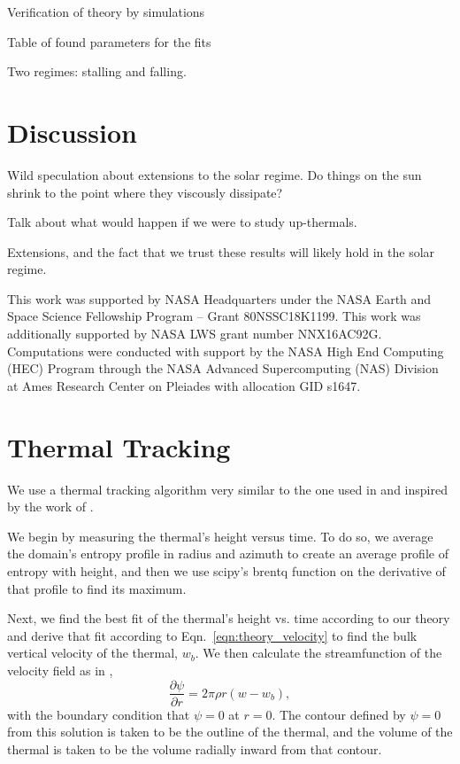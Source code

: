 \documentclass[twocolumn, amsmath, amsfonts, amssymb, trackchanges]{aastex62}
\begin{document}
Verification of theory by simulations

Table of found parameters for the fits

Two regimes: stalling and falling.


\section{Discussion}
\label{sec:discussion}
Wild speculation about extensions to the solar regime. Do things on the sun shrink
to the point where they viscously dissipate?

Talk about what would happen if we were to study up-thermals.

Extensions, and the fact that we trust these results will likely hold in the solar regime.



\begin{acknowledgements}
This work was supported by NASA Headquarters under the NASA Earth and Space
Science Fellowship Program -- Grant 80NSSC18K1199.
This work was additionally supported by  NASA LWS grant number NNX16AC92G.  
Computations were conducted 
with support by the NASA High End Computing (HEC) Program through the NASA 
Advanced Supercomputing (NAS) Division at Ames Research Center on Pleiades
with allocation GID s1647.
\end{acknowledgements}

\appendix
\section{Thermal Tracking}
\label{appendix:tracking}
We use a thermal tracking algorithm very similar to the one used in 
\citet{lecoanet&jeevanjee2018} and inspired by the work of 
\citet{romps&all2015}. 

We begin by measuring the thermal's height versus
time. To do so, we average the domain's entropy profile in radius and azimuth
to create an average profile of entropy with height, and then we use
scipy's brentq function on the derivative of that profile to find its maximum.

Next, we find the best fit of the thermal's height vs. time according to our theory
and derive that fit according to Eqn.~\ref{eqn:theory_velocity} to find the bulk
vertical velocity of the thermal, $w_b$. We then calculate the streamfunction of
the velocity field as in \citet{romps&all2015},
\begin{equation}
\frac{\partial \psi}{\partial r} = 2\pi \rho r (w - w_b),
\end{equation}
with the boundary condition that $\psi = 0$ at $r = 0$. The contour defined by $\psi = 0$
from this solution is taken to be the outline of the thermal, and the volume of the thermal
is taken to be the volume radially inward from that contour.
\end{document}
